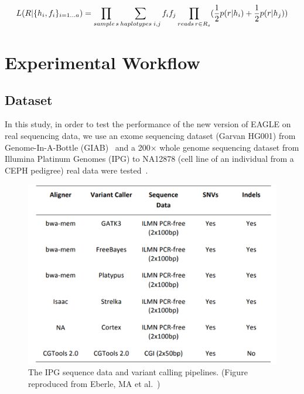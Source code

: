 \documentclass[PhD]{PHlab-thesis}
\begin{document}
\begin{equation}
  L(R|\{ {h_i,f_i} \}_{i=1...a}) = \prod_{sample \hspace{0.5mm} s}\sum_{haplotypes \hspace{0.75mm} i,j} {f_if_j} \prod_{reads \hspace{0.5mm} r \in R_s} (\frac{1}{2}p(r|h_i) + \frac{1}{2} p(r|h_j))
\end{equation}

\chapter{Experimental Workflow}
\section{Dataset}
In this study, in order to test the performance of the new version of EAGLE on real sequencing data, we use an exome sequencing dataset (Garvan HG001) from Genome-In-A-Bottle (GIAB)~\cite{Zook2014GIAB} and a 200× whole genome sequencing dataset from Illumina Platinum Genomes (IPG) to NA12878 (cell line of an individual from a CEPH pedigree) real data were tested~\cite{Eberle2021IPG}.

\begin{table}[h!]
	\centering
	\caption{The Dataset of Experiment.}
	\label{table:1}
\end{table}

\begin{figure}[h!]
	\centering
	\includegraphics[scale=0.4]{figures/IPG VariantCaller.png}
	\caption{The IPG sequence data and variant calling pipelines. (Figure reproduced from Eberle, MA et al.~\cite{Eberle2021IPG})}
	\label{fig:IPG VariantCaller} %
\end{figure}
\end{document}
